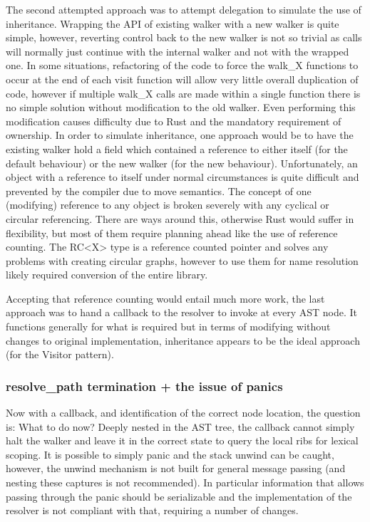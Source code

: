 The second attempted approach was to attempt delegation to simulate the use of inheritance. Wrapping the API of existing walker with a new walker is quite simple, however, reverting control back to the new walker is not so trivial as calls will normally just continue with the internal walker and not with the wrapped one. In some situations, refactoring of the code to force the walk\_X functions to occur at the end of each visit function will allow very little overall duplication of code, however if multiple walk\_X calls are made within a single function there is no simple solution without modification to the old walker. Even performing this modification causes difficulty due to Rust and the mandatory requirement of ownership. In order to simulate inheritance, one approach would be to have the existing walker hold a field which contained a reference to either itself (for the default behaviour) or the new walker (for the new behaviour). Unfortunately, an object with a reference to itself under normal circumstances is quite difficult and prevented by the compiler due to move semantics. The concept of one (modifying) reference to any object is broken severely with any cyclical or circular referencing. There are ways around this, otherwise Rust would suffer in flexibility, but most of them require planning ahead like the use of reference counting. The RC<X> type is a reference counted pointer and solves any problems with creating circular graphs, however to use them for name resolution likely required conversion of the entire library.

Accepting that reference counting would entail much more work, the last approach was to hand a callback to the resolver to invoke at every AST node. It functions generally for what is required but in terms of modifying without changes to original implementation, inheritance appears to be the ideal approach (for the Visitor pattern).

\subsubsection{resolve\_path termination + the issue of panics}
Now with a callback, and identification of the correct node location, the question is: What to do now? Deeply nested in the AST tree, the callback cannot simply halt the walker and leave it in the correct state to query the local ribs for lexical scoping. It is possible to simply panic and the stack unwind can be caught, however, the unwind mechanism is not built for general message passing (and nesting these captures is not recommended). In particular information that allows passing through the panic should be serializable and the implementation of the resolver is not compliant with that, requiring a number of changes. 

